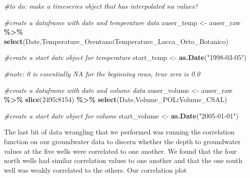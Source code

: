 \documentclass[
]{article}
\newenvironment{Shaded}{\begin{snugshade}}{\end{snugshade}}
\newcommand{\CommentTok}[1]{\textcolor[rgb]{0.56,0.35,0.01}{\textit{#1}}}
\newcommand{\DecValTok}[1]{\textcolor[rgb]{0.00,0.00,0.81}{#1}}
\newcommand{\FunctionTok}[1]{\textcolor[rgb]{0.13,0.29,0.53}{\textbf{#1}}}
\newcommand{\NormalTok}[1]{#1}
\newcommand{\OtherTok}[1]{\textcolor[rgb]{0.56,0.35,0.01}{#1}}
\newcommand{\SpecialCharTok}[1]{\textcolor[rgb]{0.81,0.36,0.00}{\textbf{#1}}}
\newcommand{\StringTok}[1]{\textcolor[rgb]{0.31,0.60,0.02}{#1}}
\begin{document}
\begin{Shaded}
\begin{Highlighting}[]
\CommentTok{\#to do: make a timeseries object that has interpolated na values? }
\end{Highlighting}
\end{Shaded}

\begin{Shaded}
\begin{Highlighting}[]
\CommentTok{\#create a dataframe with date and temperature data}
\NormalTok{auser\_temp }\OtherTok{\textless{}{-}}\NormalTok{ auser\_raw }\SpecialCharTok{\%\textgreater{}\%} 
  \FunctionTok{select}\NormalTok{(Date,Temperature\_Orentano}\SpecialCharTok{:}\NormalTok{Temperature\_Lucca\_Orto\_Botanico)}

\CommentTok{\#create a start date object for temperature}
\NormalTok{start\_temp }\OtherTok{\textless{}{-}} \FunctionTok{as.Date}\NormalTok{(}\StringTok{"1998{-}03{-}05"}\NormalTok{)}

\CommentTok{\#note: 0 is essentially NA for the beginning rows, true zero is 0.0}
\end{Highlighting}
\end{Shaded}

\begin{Shaded}
\begin{Highlighting}[]
\CommentTok{\#create a dataframe with date and volume data}
\NormalTok{auser\_volume }\OtherTok{\textless{}{-}}\NormalTok{ auser\_raw }\SpecialCharTok{\%\textgreater{}\%} 
  \FunctionTok{slice}\NormalTok{(}\DecValTok{2495}\SpecialCharTok{:}\DecValTok{8154}\NormalTok{) }\SpecialCharTok{\%\textgreater{}\%} 
  \FunctionTok{select}\NormalTok{(Date,Volume\_POL}\SpecialCharTok{:}\NormalTok{Volume\_CSAL)}

\CommentTok{\#create a start date object for volume}
\NormalTok{start\_volume }\OtherTok{\textless{}{-}} \FunctionTok{as.Date}\NormalTok{(}\StringTok{"2005{-}01{-}01"}\NormalTok{)}
\end{Highlighting}
\end{Shaded}

The last bit of data wrangling that we performed was running the
correlation function on our groundwater data to discern whether the
depth to groundwater values at the five wells were correlated to one
another. We found that the four north wells had similar correlation
values to one another and that the one south well was weakly correlated
to the others. Our correlation plot
\end{document}
